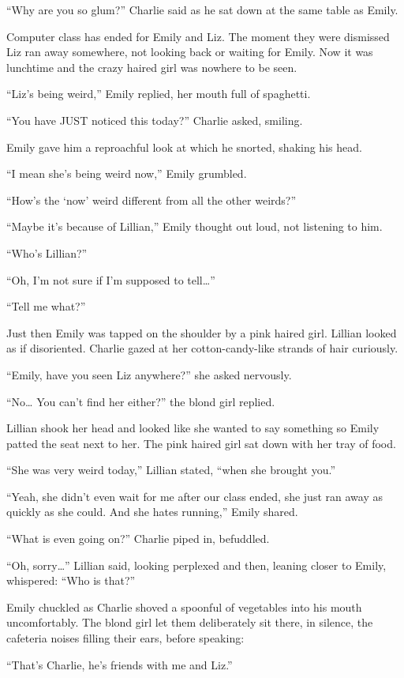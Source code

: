 “Why are you so glum?” Charlie said as he sat down at the same table as Emily.

Computer class has ended for Emily and Liz. The moment they were dismissed Liz ran away somewhere, not looking back or waiting for Emily. Now it was lunchtime and the crazy haired girl was nowhere to be seen.

“Liz's being weird,” Emily replied, her mouth full of spaghetti.

“You have JUST noticed this today?” Charlie asked, smiling.

Emily gave him a reproachful look at which he snorted, shaking his head.

“I mean she's being weird now,” Emily grumbled.

“How's the ‘now' weird different from all the other weirds?”

“Maybe it's because of Lillian,” Emily thought out loud, not listening to him.

“Who's Lillian?”

“Oh, I'm not sure if I'm supposed to tell…”

“Tell me what?”

Just then Emily was tapped on the shoulder by a pink haired girl. Lillian looked as if disoriented. Charlie gazed at her cotton-candy-like strands of hair curiously.

“Emily, have you seen Liz anywhere?” she asked nervously.

“No… You can't find her either?” the blond girl replied.

Lillian shook her head and looked like she wanted to say something so Emily patted the seat next to her. The pink haired girl sat down with her tray of food.

“She was very weird today,” Lillian stated, “when she brought you.”

“Yeah, she didn't even wait for me after our class ended, she just ran away as quickly as she could. And she hates running,” Emily shared.

“What is even going on?” Charlie piped in, befuddled.

“Oh, sorry…” Lillian said, looking perplexed and then, leaning closer to Emily, whispered: “Who is that?”

Emily chuckled as Charlie shoved a spoonful of vegetables into his mouth uncomfortably. The blond girl let them deliberately sit there, in silence, the cafeteria noises filling their ears, before speaking:

“That's Charlie, he's friends with me and Liz.”

